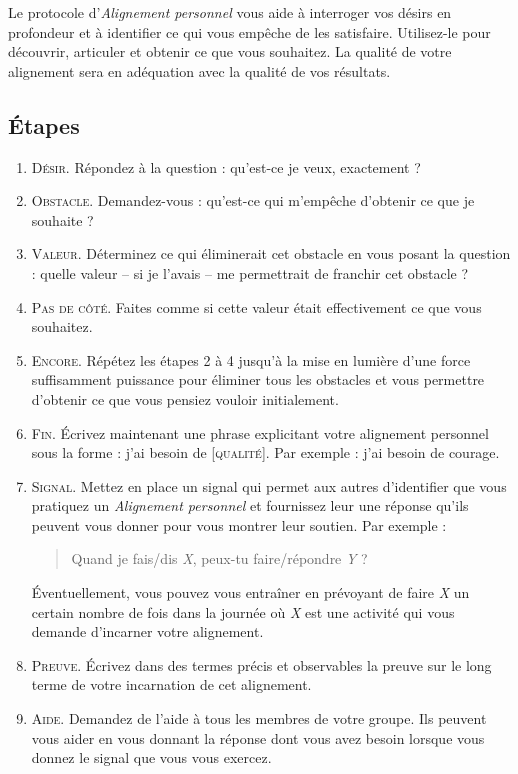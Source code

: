 \documentclass[11pt]{book}
\begin{document}
Le protocole d'\emph{Alignement personnel} vous aide à interroger vos désirs en profondeur et à identifier ce qui vous empêche de les satisfaire. Utilisez-le
pour découvrir, articuler et obtenir ce que vous souhaitez. La qualité de votre alignement sera en adéquation avec la qualité de vos résultats.

\subsection{Étapes}
\begin{enumerate}
	\item \textsc{Désir.} Répondez à la question : \og{}qu'est-ce je veux, exactement ?\fg{}
	\item \textsc{Obstacle.} Demandez-vous : \og{}qu'est-ce qui m'empêche d'obtenir ce que je souhaite ?\fg{}
	\item \textsc{Valeur.} Déterminez ce qui éliminerait cet obstacle en vous posant la question : \og{}quelle valeur -- si je 
	      l'avais -- me permettrait de franchir cet obstacle ?\fg{}
	\item \textsc{Pas de côté.} Faites comme si cette valeur était effectivement ce que vous souhaitez.
	\item \textsc{Encore.} Répétez les étapes 2 à 4 jusqu'à la mise en lumière d'une force suffisamment puissance pour éliminer tous les obstacles et vous permettre
	      d'obtenir ce que vous pensiez vouloir initialement.
	\item \textsc{Fin.} Écrivez maintenant une phrase explicitant votre alignement personnel sous la forme : \og{}j'ai besoin de [\textsc{qualité}]\fg{}.
	      Par exemple : \og{}j'ai besoin de courage\fg{}.
	\item \textsc{Signal.} Mettez en place un signal qui permet aux autres d'identifier que vous pratiquez un \emph{Alignement personnel}
	      et fournissez leur une réponse qu'ils peuvent vous donner pour vous montrer leur soutien. Par exemple :
	      \begin{quote}
	      	\og{}Quand je fais/dis \emph{X}, peux-tu faire/répondre \emph{Y} ?\fg{}
	      \end{quote}
	      Éventuellement, vous pouvez vous entraîner en prévoyant de faire \emph{X} un certain nombre de fois dans la journée où \emph{X} est une activité
	      qui vous demande d'incarner votre alignement.
	\item \textsc{Preuve.} Écrivez dans des termes précis et observables la preuve sur le long terme de votre incarnation de cet alignement.
	\item \textsc{Aide.} Demandez de l'aide à tous les membres de votre groupe. Ils peuvent vous aider en vous donnant la réponse dont vous avez besoin lorsque
	      vous donnez le signal que vous vous exercez.
\end{enumerate}
\end{document}

